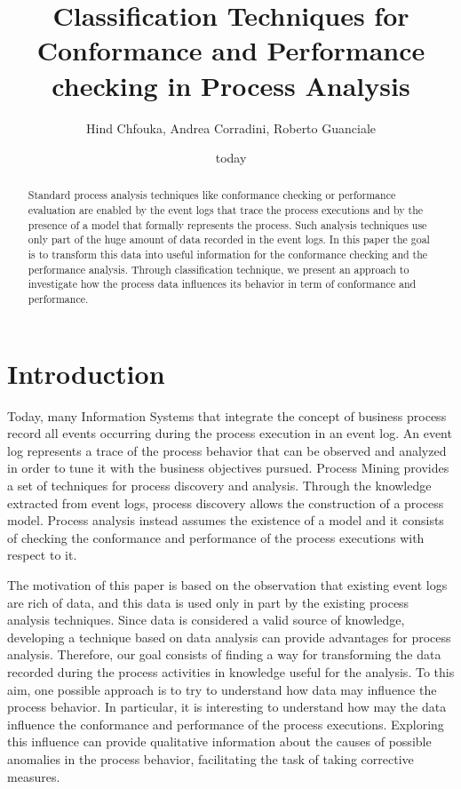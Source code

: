 \documentclass{llncs}
\title{Classification Techniques for Conformance and Performance checking in Process Analysis}
\author{Hind Chfouka, Andrea Corradini, Roberto Guanciale}
\institute{Department of Computer Science, Università di Pisa}
\date{today}
\begin{document}
\maketitle
\begin{abstract}
Standard process analysis techniques like conformance checking or performance evaluation are enabled by the event logs that trace the process executions and by the presence of a model that formally represents the process. Such analysis techniques use only part of the huge amount of data recorded in the event logs. In this paper the goal is to transform this data into useful information for the conformance checking and the performance analysis. Through classification technique, we present an approach to investigate how the process data influences its behavior in term of conformance and performance. 
\end{abstract}

\section{Introduction}

Today, many Information Systems that integrate the concept of business process record all events occurring during the process execution in an event log. An event log represents a trace of the process behavior that can be observed and analyzed in order to tune it with the business objectives pursued. Process Mining provides a set of techniques for process discovery and analysis. Through the knowledge extracted from event logs, process discovery allows the construction of a process model. Process analysis instead assumes the existence of a model and it consists of checking the conformance and performance of the process executions with respect to it.

The motivation of this paper is based on the observation that existing event logs are rich of data, and this data is used only in part by the existing process analysis techniques. Since data is considered a valid source of knowledge, developing a technique based on data analysis can provide advantages for  process analysis.
Therefore, our goal consists of finding a way for transforming the data recorded during the process activities in knowledge useful for the analysis. To this aim, one possible approach is to try to understand how data may influence the process behavior. In particular, it is interesting to understand how may the data influence the conformance and performance of the process executions. Exploring this influence can provide qualitative information about the causes of possible anomalies in the process behavior, facilitating the task of taking corrective measures.
\end{document}
